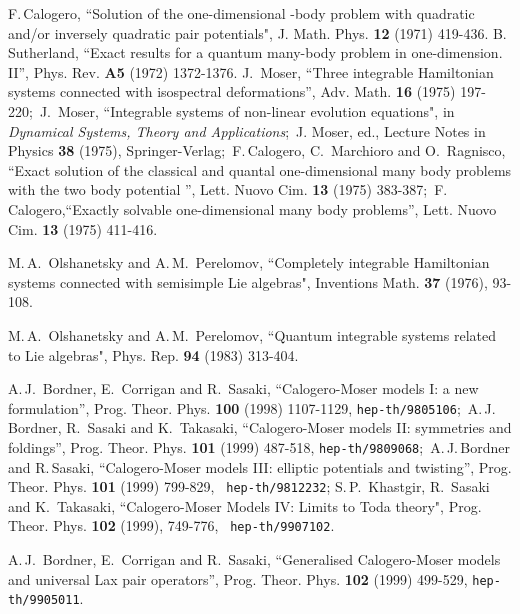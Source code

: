 \documentclass[a4paper,12pt]{article}
\begin{document}
\begin{thebibliography}{99}
  F.\,Calogero, ``Solution of the one-dimensional
\coordHE{}-body problem with quadratic and/or inversely quadratic pair
potentials", J. Math. Phys. {\bf 12} (1971) 419-436.
B.\, Sutherland, ``Exact results for a quantum many-body problem in
one-dimension. II'', Phys. Rev. {\bf A5} (1972) 1372-1376.
J.\, Moser, ``Three integrable Hamiltonian systems connected with
isospectral deformations'',  Adv. Math. {\bf 16} (1975) 197-220;\
J.\, Moser,  ``Integrable systems of non-linear evolution equations",
in {\it Dynamical Systems, Theory and Applications\/};\
J. Moser, ed., Lecture Notes in Physics {\bf 38} (1975),
Springer-Verlag;\
F.\,Calogero, C.\, Marchioro and O.\, Ragnisco, ``Exact solution of the
classical and quantal one-dimensional many body problems with
the two body potential \coordHE{}'', Lett. Nuovo
Cim. {\bf 13} (1975) 383-387;\
F.\,Calogero,``Exactly solvable one-dimensional many body problems'',
Lett. Nuovo Cim. {\bf 13} (1975) 411-416.

\bibitem{OP1} M.\,A.\, Olshanetsky and A.\,M.\, Perelomov,
``Completely integrable Hamiltonian systems connected with
 semisimple Lie algebras",
 Inventions Math. {\bf 37} (1976), 93-108.

\bibitem{OP2}
M.\,A.\, Olshanetsky and A.\,M.\, Perelomov, ``Quantum integrable
systems
related to Lie algebras",
Phys. Rep. {\bf 94} (1983) 313-404.



 A.\,J.\, Bordner, E.\, Corrigan and R.\, Sasaki,
``Calogero-Moser models I: a new formulation'',
Prog. Theor. Phys. {\bf 100} (1998) 1107-1129, {\tt hep-th/9805106};\
A.\,J.\, Bordner,   R.\,
Sasaki and K.\, Takasaki, ``Calogero-Moser models II:
symmetries and foldings'', Prog. Theor. Phys. {\bf
101} (1999) 487-518, {\tt hep-th/9809068};\ A.\,J.\,Bordner and
R.\,Sasaki, ``Calogero-Moser models III: elliptic potentials and
twisting'', Prog. Theor. Phys. {\bf 101} (1999) 799-829, {\tt
hep-th/9812232};
S.\,P.\, Khastgir, R.\, Sasaki and K.\, Takasaki,
``Calogero-Moser Models IV: Limits to Toda theory",
 Prog. Theor. Phys. {\bf 102}  (1999), 749-776, {\tt
hep-th/9907102}.

\bibitem{bcs2}  A.\,J.\, Bordner, E.\, Corrigan and R.\, Sasaki,
``Generalised Calogero-Moser models and  universal Lax pair operators'',
 Prog. Theor. Phys. {\bf 102}  (1999)  499-529,
 {\tt  hep-th/9905011}.




\end{thebibliography}
\end{document}
